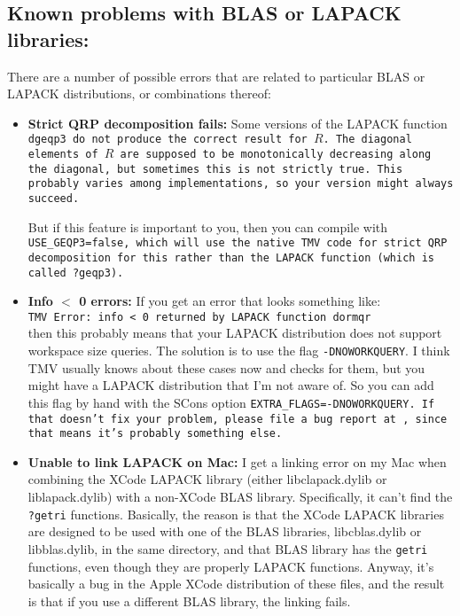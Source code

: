 \subsection{Known problems with BLAS or LAPACK libraries:}
There are a number of possible errors that are related to particular BLAS or LAPACK
distributions, or combinations thereof:
\begin{itemize}

\item{\bf Strict QRP decomposition fails:}
Some versions of the LAPACK function \tt{dgeqp3} do not produce the correct
result for $R$.  The diagonal elements of $R$ are supposed to be monotonically decreasing
along the diagonal, but sometimes this is not strictly true.  This probably varies among
implementations, so your version might always succeed.

But if this feature is important to you, then you can compile with \tt{USE_GEQP3=false},
which will use the native TMV code for strict QRP decomposition for this 
rather than the LAPACK function (which is called \tt{?geqp3}).

\item{\bf Info $<$ 0 errors:}
If you get an error that looks something like:\\
\texttt{TMV Error: info < 0 returned by LAPACK function dormqr}\\
then this probably means that your LAPACK distribution does not support
workspace size queries.  The solution is to use the flag \texttt{-DNOWORKQUERY}.
I think TMV usually knows about these cases now and checks for them, but you might have a LAPACK distribution that I'm not aware of.  So you can add this flag by hand with the SCons option \tt{EXTRA_FLAGS=-DNOWORKQUERY}.  If that doesn't fix your problem, please file a bug report at  \myissues, since that means it's probably something else.

\item {\bf Unable to link LAPACK on Mac:}
I get a linking error on my Mac when combining the XCode LAPACK library
(either libclapack.dylib or liblapack.dylib) with a non-XCode BLAS library.
Specifically, it can't find the \texttt{?getri} functions.   Basically, the reason is that
the XCode LAPACK libraries are designed to be used with one of the BLAS
libraries, libcblas.dylib or libblas.dylib, in the same directory, 
and that BLAS library has the \texttt{getri}
functions, even though they are properly LAPACK functions.
Anyway, it's basically a bug in the Apple XCode distribution of these files,
and the result is that if you use a different BLAS library, the linking fails.


\end{itemize}
